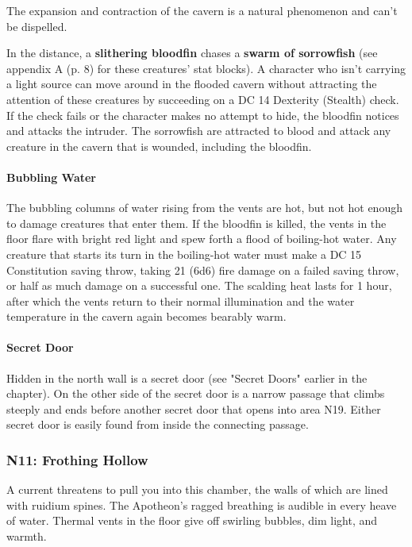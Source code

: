 \documentclass[a4paper, 11pt, bg=full, twocolumn, nooutline]{dndbook}
\begin{document}
The expansion and contraction of the cavern is a natural phenomenon and can't be dispelled.

In the distance, a \textbf{slithering bloodfin} chases a \textbf{swarm of sorrowfish} (see appendix A (p. 8) for these creatures' stat blocks). A character who isn't carrying a light source can move around in the flooded cavern without attracting the attention of these creatures by succeeding on a DC 14 Dexterity (Stealth) check. If the check fails or the character makes no attempt to hide, the bloodfin notices and attacks the intruder. The sorrowfish are attracted to blood and attack any creature in the cavern that is wounded, including the bloodfin.

\paragraph{Bubbling Water}

The bubbling columns of water rising from the vents are hot, but not hot enough to damage creatures that enter them. If the bloodfin is killed, the vents in the floor flare with bright red light and spew forth a flood of boiling-hot water. Any creature that starts its turn in the boiling-hot water must make a DC 15 Constitution saving throw, taking 21 (6d6) fire damage on a failed saving throw, or half as much damage on a successful one. The scalding heat lasts for 1 hour, after which the vents return to their normal illumination and the water temperature in the cavern again becomes bearably warm.

\paragraph{Secret Door}

Hidden in the north wall is a secret door (see "Secret Doors" earlier in the chapter). On the other side of the secret door is a narrow passage that climbs steeply and ends before another secret door that opens into area N19. Either secret door is easily found from inside the connecting passage.

\subsubsection{N11: Frothing Hollow}

\begin{DndReadAloud}
A current threatens to pull you into this chamber, the walls of which are lined with ruidium spines. The Apotheon's ragged breathing is audible in every heave of water. Thermal vents in the floor give off swirling bubbles, dim light, and warmth.
\end{DndReadAloud}
\end{document}

